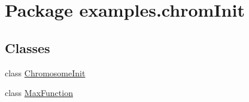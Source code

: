 \hypertarget{namespaceexamples_1_1chrom_init}{\section{Package examples.\-chrom\-Init}
\label{namespaceexamples_1_1chrom_init}
}
\subsection*{Classes}
\begin{DoxyCompactItemize}
\item 
class \hyperlink{classexamples_1_1chrom_init_1_1_chromosome_init}{Chromosome\-Init}
\item 
class \hyperlink{classexamples_1_1chrom_init_1_1_max_function}{Max\-Function}
\end{DoxyCompactItemize}
